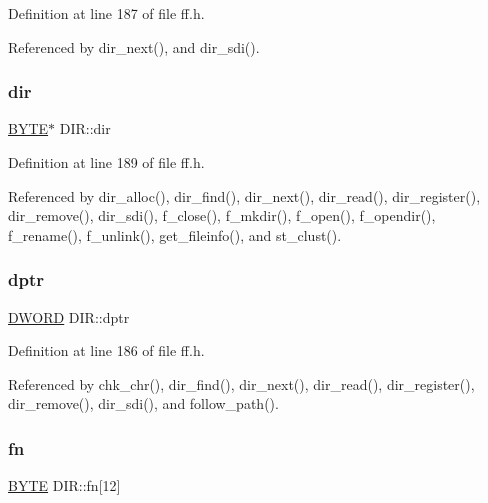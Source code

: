 Definition at line 187 of file ff.\+h.



Referenced by dir\+\_\+next(), and dir\+\_\+sdi().

\mbox{\label{structDIR_a6c2a8c0cf2d55ae99775e93a16593449}} 
\subsubsection{\texorpdfstring{dir}{dir}}
{\footnotesize\ttfamily \hyperlink{lz4_8c_a4ae1dab0fb4b072a66584546209e7d58}{B\+Y\+TE}$\ast$ D\+I\+R\+::dir}



Definition at line 189 of file ff.\+h.



Referenced by dir\+\_\+alloc(), dir\+\_\+find(), dir\+\_\+next(), dir\+\_\+read(), dir\+\_\+register(), dir\+\_\+remove(), dir\+\_\+sdi(), f\+\_\+close(), f\+\_\+mkdir(), f\+\_\+open(), f\+\_\+opendir(), f\+\_\+rename(), f\+\_\+unlink(), get\+\_\+fileinfo(), and st\+\_\+clust().

\mbox{\label{structDIR_a0330e9554e1f38795debe4495156873e}} 
\subsubsection{\texorpdfstring{dptr}{dptr}}
{\footnotesize\ttfamily \hyperlink{integer_8h_ad342ac907eb044443153a22f964bf0af}{D\+W\+O\+RD} D\+I\+R\+::dptr}



Definition at line 186 of file ff.\+h.



Referenced by chk\+\_\+chr(), dir\+\_\+find(), dir\+\_\+next(), dir\+\_\+read(), dir\+\_\+register(), dir\+\_\+remove(), dir\+\_\+sdi(), and follow\+\_\+path().

\mbox{\label{structDIR_ad90d974c0e7640307598c586bf141b32}} 
\subsubsection{\texorpdfstring{fn}{fn}}
{\footnotesize\ttfamily \hyperlink{lz4_8c_a4ae1dab0fb4b072a66584546209e7d58}{B\+Y\+TE} D\+I\+R\+::fn\mbox{[}12\mbox{]}}



